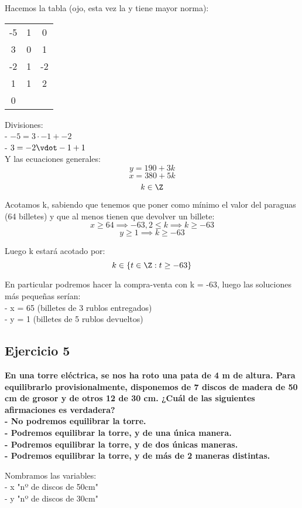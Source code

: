 \documentclass[11pt, a4paper, titlepage]{article}
\begin{document}
Hacemos la tabla (ojo, esta vez la y tiene mayor norma):

\begin{center}
\begin{tabular}{c|cc}
-5 & 1 & 0 \\
3 & 0 & 1 \\
\hline
-2 & 1 & -2 \\
\hline
1 & 1 & 2 \\
\hline
0
\end{tabular}
\end{center}

Divisiones: \\
- $ -5 = 3 \cdot -1 + -2 $ \\
- $ 3 = -2 \vdot -1 + 1 $ \\

Y las ecuaciones generales:
$$ y = 190 + 3k $$
$$ x = 380 + 5k $$
$$ k \in \Z $$

Acotamos k, sabiendo que tenemos que poner como mínimo el valor del paraguas (64 billetes) y que al menos tienen que devolver un billete:
$$ x \geq 64 \implies -63,2 \leq k \implies k \geq -63 $$
$$ y \geq 1 \implies k \geq -63 $$

Luego k estará acotado por:
$$ k \in \{ t \in \Z : t \geq -63 \} $$

En particular podremos hacer la compra-venta con k = -63, luego las soluciones más pequeñas serían: \\
- x = 65 (billetes de 3 rublos entregados) \\
- y = 1 (billetes de 5 rublos devueltos) \\

\subsection{\LARGE{Ejercicio 5}}

\textbf{En una torre eléctrica, se nos ha roto una pata de 4 m de altura. Para
equilibrarlo provisionalmente, disponemos de 7 discos de madera de 50 cm de grosor
y de otros 12 de 30 cm. ¿Cuál de las siguientes afirmaciones es verdadera? \\
 - No podremos equilibrar la torre. \\
 - Podremos equilibrar la torre, y de una única manera. \\
 - Podremos equilibrar la torre, y de dos únicas maneras. \\
 - Podremos equilibrar la torre, y de más de 2 maneras distintas.}

Nombramos las variables: \\
- x \equiv "nº de discos de 50cm" \\
- y \equiv "nº de discos de 30cm" \\
\end{document}
